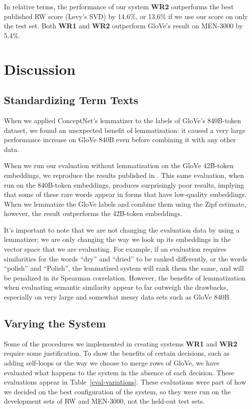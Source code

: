 \documentclass[11pt,letterpaper]{article}
\begin{document}
In relative terms, the performance of our system {\bf WR2} outperforms the best
published RW score (Levy's SVD) by 14.6\%, or 13.6\% if we use our score on only
the test set. Both {\bf WR1} and {\bf WR2} outperform GloVe's result on
MEN-3000 by 5.4\%.

\section{Discussion}

\subsection{Standardizing Term Texts}

When we applied ConceptNet's lemmatizer to the labels of GloVe's 840B-token
dataset, we found an unexpected benefit of lemmatization: it caused a very
large performance increase on GloVe 840B even before combining it with any
other data.

When we run our evaluation without lemmatization on the GloVe 42B-token
embeddings, we reproduce the results published in \cite{pennington2014glove}.
This same evaluation, when run on the 840B-token embeddings, produces
surprisingly poor results, implying that some of these rare words appear in
forms that have low-quality embeddings. When we lemmatize the GloVe labels and
combine them using the Zipf estimate, however, the result outperforms the
42B-token embeddings.

It's important to note that we are not changing the evaluation data by using
a lemmatizer; we are only changing the way we look up its embeddings in the
vector space that we are evaluating. For example, if an evaluation requires
similarities for the words ``dry'' and ``dried'' to be ranked differently, or
the words ``polish'' and ``Polish'', the lemmatized system will rank them the
same, and will be penalized in its Spearman correlation.
However, the benefits of lemmatization when evaluating semantic similarity
appear to far outweigh the drawbacks, especially on very large and somewhat
messy data sets such as GloVe 840B.

\subsection{Varying the System}

Some of the procedures we implemented in creating systems {\bf WR1} and
{\bf WR2} require some justification. To show the benefits of certain decisions,
such as adding self-loops or the way we choose to merge rows of GloVe, we have
evaluated what happens to the system in the absence of each decision. These
evaluations appear in Table~\ref{eval-variations}. These evaluations were
part of how we decided on the best configuration of the system, so they were
run on the development sets of RW and MEN-3000, not the held-out test sets.
\end{document}
